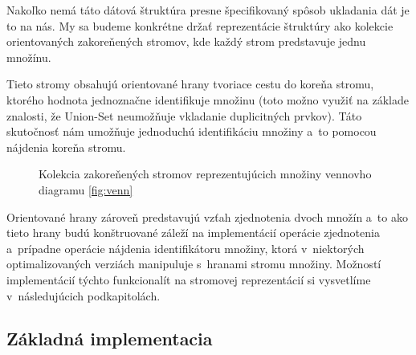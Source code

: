 Nakoľko nemá táto dátová štruktúra presne špecifikovaný spôsob ukladania dát je to na nás. My sa budeme konkrétne držať reprezentácie štruktúry ako kolekcie orientovaných zakoreňených stromov, kde každý strom predstavuje jednu množínu. \cite{union-find-kriky}

Tieto stromy obsahujú orientované hrany tvoriace cestu do koreňa stromu, ktorého hodnota jednoznačne identifikuje množinu (toto možno využiť na základe znalosti, že Union-Set neumožňuje vkladanie duplicitných prvkov). Táto skutočnosť nám umožňuje jednoduchú identifikáciu množiny a~to pomocou nájdenia koreňa stromu.

\begin{figure}[H]
    \centering
    \captionsetup{justification=centering}
    
    \caption{Kolekcia zakoreňených stromov reprezentujúcich množiny vennovho diagramu \ref{fig:venn}}
    \label{fig:stromy}
\end{figure}

Orientované hrany zároveň predstavujú vzťah zjednotenia dvoch množín a~to ako tieto hrany budú konštruované záleží na implementácií operácie zjednotenia a~prípadne operácie nájdenia identifikátoru množiny, ktorá v~niektorých optimalizovaných verziách manipuluje s~hranami stromu množiny. Možností implementácií týchto funkcionalít na stromovej reprezentácií si vysvetlíme v~následujúcich podkapitolách.

\subsection{Základná implementacia}

